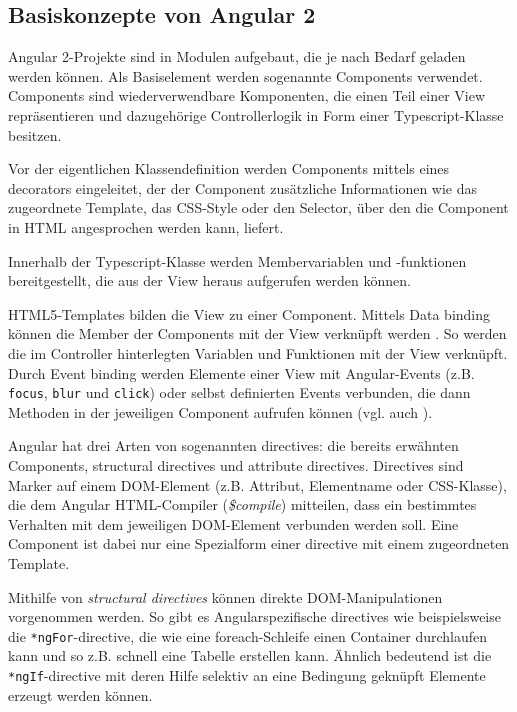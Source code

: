 \subsection{Basiskonzepte von Angular 2}
Angular 2-Projekte sind in Modulen aufgebaut, die je nach Bedarf geladen werden können. Als Basiselement werden sogenannte Components verwendet. Components sind wiederverwendbare Komponenten, die einen Teil einer View repräsentieren und dazugehörige Controllerlogik in Form einer Typescript-Klasse besitzen. 

Vor der eigentlichen Klassendefinition werden Components mittels eines decorators eingeleitet, der der Component zusätzliche Informationen wie das zugeordnete Template, das CSS-Style oder den Selector, über den die Component in HTML angesprochen werden kann, liefert.
%

Innerhalb der Typescript-Klasse werden Membervariablen und -funktionen bereitgestellt, die aus der View heraus aufgerufen werden können.

HTML5-Templates bilden die View zu einer Component. Mittels Data binding können die Member der Components mit der View verknüpft werden \cite{LynchAngularComponents}. So werden die im Controller hinterlegten Variablen und Funktionen mit der View verknüpft. Durch Event binding werden Elemente einer View mit Angular-Events (z.B. \texttt{focus}, \texttt{blur} und \texttt{click}) oder selbst definierten Events verbunden, die dann Methoden in der jeweiligen Component aufrufen können (vgl. auch  \cite{PrechtAngularTemplateSyntax}).

Angular hat drei Arten von sogenannten directives: die bereits erwähnten Components, structural directives und attribute directives. Directives sind Marker auf einem DOM-Element (z.B. Attribut, Elementname oder CSS-Klasse), die dem Angular HTML-Compiler (\emph{\$compile}) mitteilen, dass ein bestimmtes Verhalten mit dem jeweiligen DOM-Element verbunden werden soll. Eine Component ist dabei nur eine Spezialform einer directive mit einem zugeordneten Template.

Mithilfe von \emph{structural directives} können direkte DOM-Manipulationen vorgenommen werden. So gibt es Angularspezifische directives wie beispielsweise die  \texttt{*ngFor}-directive, die wie eine foreach-Schleife einen Container durchlaufen kann und so z.B. schnell eine Tabelle erstellen kann. Ähnlich bedeutend ist die \texttt{*ngIf}-directive mit deren Hilfe selektiv an eine Bedingung geknüpft Elemente erzeugt werden können.

